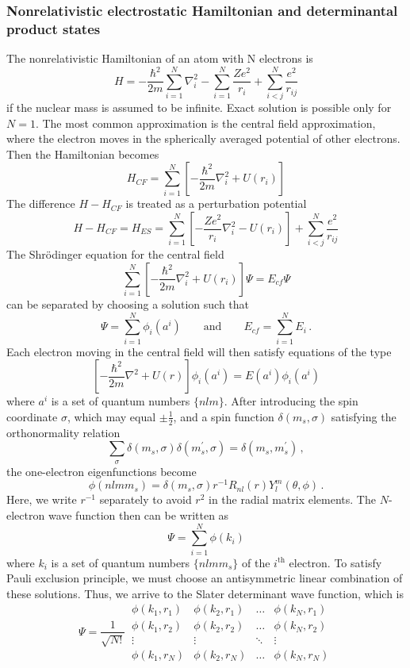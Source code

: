 \documentclass[a4paper,oneside,12pt]{extarticle}
\begin{document}
\subsubsection {Nonrelativistic electrostatic Hamiltonian and determinantal product states}
%
The nonrelativistic Hamiltonian of an atom with N electrons is
%
$$
H = - \frac{\hbar^2}{2m} \sum_{i=1}^N \nabla_i^2 - \sum_{i=1}^N \frac{Ze^2}{r_i} + \sum_{i<j}^N \frac{e^2}{r_{ij}}
$$
if the nuclear mass is assumed to be infinite. Exact solution is possible only for $N=1$. The most common approximation is the central field approximation, where the electron moves in the spherically averaged potential of other electrons. Then the Hamiltonian becomes
%
$$
H_{CF} = \sum_{i=1}^N \left[ - \frac{\hbar^2}{2m}\nabla_i^2 + U(r_i) \right]
$$
%
The difference $H-H_{CF}$ is treated as a perturbation potential
%
$$
H-H_{CF} = H_{ES} = \sum_{i=1}^N \left[ - \frac{Ze^2}{r_i}\nabla_i^2 - U(r_i) \right] + \sum_{i<j}^N \frac{e^2}{r_{ij}}
$$
%
The Shr\"odinger equation for the central field
$$
\sum_{i=1}^N \left[ - \frac{\hbar^2}{2m}\nabla_i^2 + U(r_i) \right] \Psi = E_{cf} \Psi
$$
%
can be separated by choosing a solution such that
%
$$
\Psi = \sum_{i=1}^N \phi_i(a^i) \qquad \textrm{and} \qquad  E_{cf}=\sum_{i=1}^N E_i \,.
$$
%
Each electron moving in the central field will then satisfy equations of the type
%
$$
\left[ - \frac{\hbar^2}{2m}\nabla^2 + U(r) \right] \phi_i(a^i) = E(a^i)\phi_i(a^i)
$$
%
where $a^i$ is a set of quantum numbers $\{nlm\}$. After introducing the spin coordinate $\sigma$, which may equal $\pm\frac{1}{2}$, and a spin function $\delta(m_s,\sigma)$ satisfying the orthonormality relation
%
$$
\sum_\sigma \delta(m_s,\sigma) \delta(m_s^\prime,\sigma) = \delta(m_s, m_s^\prime) \,,
$$
%
the one-electron eigenfunctions become
%
$$
\phi(nlmm_s) = \delta(m_s,\sigma) r^{-1} R_{nl}(r) Y_l^m(\theta, \phi) \,.
$$
%
Here, we write $r^{-1}$ separately to avoid $r^2$ in the radial matrix elements.
The $N$-electron wave function then can be written as
%
$$
\Psi = \sum_{i=1}^N \phi(k_i)
$$
%
where $k_i$ is a set of quantum numbers $\{nlmm_s\}$ of the $i^{\textrm{th}}$ electron. To satisfy Pauli exclusion principle, we must choose an antisymmetric linear combination of these solutions. Thus, we arrive to the Slater determinant wave function, which is
%
$$
\Psi = \frac{1}{\sqrt{N!}} \,
\begin{array}{|cccc|}
\phi(k_1, r_1) & \phi(k_2, r_1) &\ldots & \phi(k_N, r_1)\\
\phi(k_1, r_2)& \phi(k_2, r_2) &\ldots & \phi(k_N, r_2)\\
\vdots & \vdots &\ddots & \vdots\\
\phi(k_1, r_N) & \phi(k_2, r_N) &\ldots & \phi(k_N, r_N)
\end{array}
$$
\end{document}
